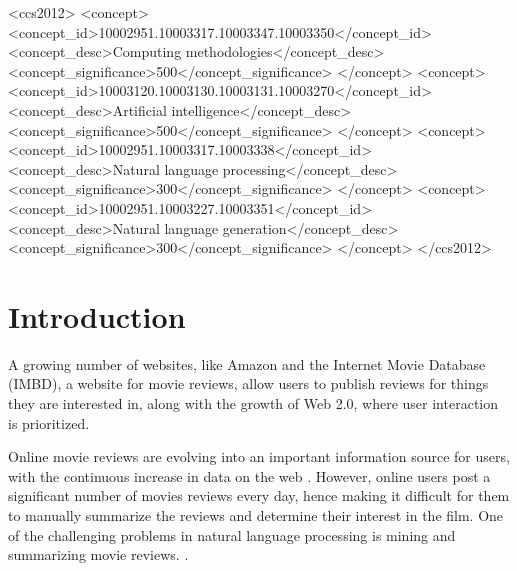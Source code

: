 \documentclass[manuscript,screen,natbib=false]{acmart}
\begin{document}
\begin{CCSXML}
<ccs2012>
<concept>
<concept_id>10002951.10003317.10003347.10003350</concept_id>
<concept_desc>Computing methodologies</concept_desc>
<concept_significance>500</concept_significance>
</concept>
<concept>
<concept_id>10003120.10003130.10003131.10003270</concept_id>
<concept_desc>Artificial intelligence</concept_desc>
<concept_significance>500</concept_significance>
</concept>
<concept>
<concept_id>10002951.10003317.10003338</concept_id>
<concept_desc>Natural language processing</concept_desc>
<concept_significance>300</concept_significance>
</concept>
<concept>
<concept_id>10002951.10003227.10003351</concept_id>
<concept_desc>Natural language generation</concept_desc>
<concept_significance>300</concept_significance>
</concept>
</ccs2012>
\end{CCSXML}



\maketitle

% 
% 

\section{Introduction}
A growing number of websites, like Amazon and the Internet Movie Database (IMBD), a website for movie reviews, allow users to publish reviews for things they are interested in, along with the growth of Web 2.0, where user interaction is prioritized. \cite{khan_gul_zareei_biswal_zeb_naeem_saeed_salim_2020}

Online movie reviews are evolving into an important information source for users, with the continuous increase in data on the web \cite{m_mehla_2019}. However, online users post a significant number of movies reviews every day, hence making it difficult for them to manually summarize the reviews and determine their interest in the film. One of the challenging problems in natural language processing is mining and summarizing movie reviews. \cite{khan_gul_zareei_biswal_zeb_naeem_saeed_salim_2020}.
\end{document}
